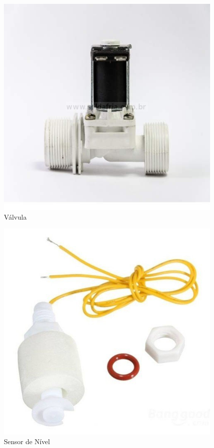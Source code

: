 \begin{figure}[!htb]
	\centering
	\includegraphics[scale=0.25]{figuras/7.jpg} 
	\caption{Válvula}
	\label{Rotulo}
\end{figure}

\begin{figure}[!htb]
	\centering
	\includegraphics[scale=0.25]{figuras/6.jpg} 
	\caption{Sensor de Nível}
	\label{Rotulo}
\end{figure}

